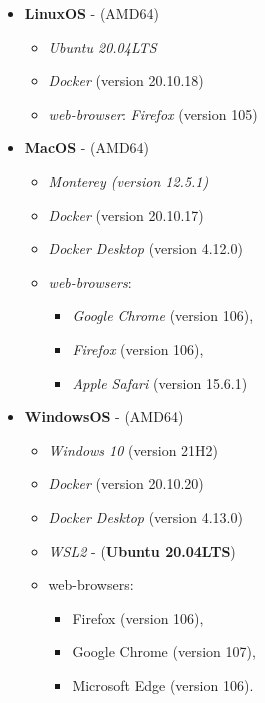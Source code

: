 \documentclass[
  a4paper,
  DIV=11,
  numbers=noendperiod,
  oneside,
  open=any]{scrreport}
\providecommand{\tightlist}{%
  \setlength{\itemsep}{0pt}\setlength{\parskip}{0pt}}\usepackage{longtable,booktabs,array}
\begin{document}
\begin{itemize}
\tightlist
\item
  \textbf{LinuxOS} - (AMD64)

  \begin{itemize}
  \tightlist
  \item
    \emph{Ubuntu 20.04LTS}
  \item
    \emph{Docker} (version 20.10.18)
  \item
    \emph{web-browser}: \emph{Firefox} (version 105)
  \end{itemize}
\item
  \textbf{MacOS} - (AMD64)

  \begin{itemize}
  \tightlist
  \item
    \emph{Monterey (version 12.5.1)}
  \item
    \emph{Docker} (version 20.10.17)
  \item
    \emph{Docker Desktop} (version 4.12.0)
  \item
    \emph{web-browsers}:

    \begin{itemize}
    \tightlist
    \item
      \emph{Google Chrome} (version 106),
    \item
      \emph{Firefox} (version 106),
    \item
      \emph{Apple Safari} (version 15.6.1)
    \end{itemize}
  \end{itemize}
\item
  \textbf{WindowsOS} - (AMD64)

  \begin{itemize}
  \tightlist
  \item
    \emph{Windows 10} (version 21H2)
  \item
    \emph{Docker} (version 20.10.20)
  \item
    \emph{Docker Desktop} (version 4.13.0)
  \item
    \emph{WSL2} - (\textbf{Ubuntu 20.04LTS})
  \item
    web-browsers:

    \begin{itemize}
    \tightlist
    \item
      Firefox (version 106),
    \item
      Google Chrome (version 107),
    \item
      Microsoft Edge (version 106).
    \end{itemize}
  \end{itemize}
\end{itemize}
\end{document}
